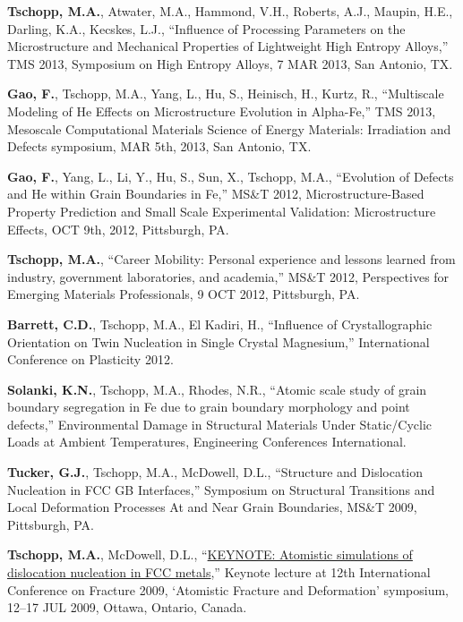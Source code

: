 \begin{cvlist}
\item
\textbf{Tschopp, M.A.}, Atwater, M.A., Hammond, V.H., Roberts, A.J., Maupin, H.E., Darling, K.A., Kecskes, L.J., ``Influence of Processing Parameters on the Microstructure and Mechanical Properties of Lightweight High Entropy Alloys,'' TMS 2013, Symposium on High Entropy Alloys, 7 MAR 2013, San Antonio, TX.

\item
\textbf{Gao, F.}, {Tschopp, M.A.}, Yang, L., Hu, S., Heinisch, H., Kurtz, R., ``Multiscale Modeling of He Effects on Microstructure Evolution in Alpha-Fe,'' TMS 2013, Mesoscale Computational Materials Science of Energy Materials: Irradiation and Defects symposium, MAR 5th, 2013, San Antonio, TX.

\item
\textbf{Gao, F.}, Yang, L., Li, Y., Hu, S., Sun, X., {Tschopp, M.A.}, ``Evolution of Defects and He within Grain Boundaries in Fe,'' MS\&T 2012, Microstructure-Based Property Prediction and Small Scale Experimental Validation: Microstructure Effects, OCT 9th, 2012, Pittsburgh, PA.

\item
\textbf{Tschopp, M.A.}, ``Career Mobility: Personal experience and lessons learned from industry, government laboratories, and academia,'' MS\&T 2012, Perspectives for Emerging Materials Professionals, 9 OCT 2012, Pittsburgh, PA.

\item 
\textbf{Barrett, C.D.}, {Tschopp, M.A.}, El Kadiri, H., ``Influence of Crystallographic Orientation on Twin Nucleation in Single Crystal Magnesium,'' International Conference on Plasticity 2012.

\item
\textbf{Solanki, K.N.}, {Tschopp, M.A.}, Rhodes, N.R., ``Atomic scale study of grain boundary segregation in Fe due to grain boundary morphology and point defects,''  Environmental Damage in Structural Materials Under Static/Cyclic Loads at Ambient Temperatures, Engineering Conferences International.

\item
\textbf{Tucker, G.J.}, {Tschopp, M.A.}, McDowell, D.L., ``Structure and Dislocation Nucleation in FCC GB Interfaces,'' Symposium on Structural Transitions and Local Deformation Processes At and Near Grain Boundaries, MS\&T 2009, Pittsburgh, PA.  

\item
\textbf{Tschopp, M.A.}, McDowell, D.L., ``\href{http://dx.doi.org/10.13140/2.1.2238.0327}{KEYNOTE: Atomistic simulations of dislocation nucleation in FCC metals},'' Keynote lecture at 12th International Conference on Fracture 2009, `Atomistic Fracture and Deformation' symposium, 12--17 JUL 2009, Ottawa, Ontario, Canada.


\end{cvlist}
